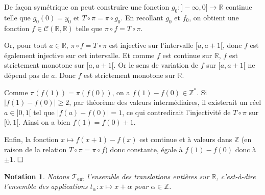 \documentclass[11pt,a4 paper]{article}
\newtheorem{nota}[theoreme]{Notation}
\newcommand{\Rbb}{\mathbb{R}}
\newcommand{\Cc}{\mathcal{C}}
\newcommand{\Tent}{\mathcal{T}_{\mathrm{ent}}}
\begin{document}
	\par De façon symétrique on peut construire une fonction $g_0:]-\infty,0]\to \Rbb$ continue telle que $g_0(0)=y_0$ et $T \circ \pi = \pi \circ g_0$. En recollant $g_0$ et $f_0$, on obtient une fonction $f \in \Cc(\Rbb,\Rbb)$ telle que $\pi \circ f = T \circ \pi$.\\
	
	\par Or, pour tout $a \in \Rbb$, $\pi\circ f=T\circ \pi$ est injective sur l'intervalle $[a,a+1[$, donc $f$ est également injective sur cet intervalle. Et comme $f$ est continue sur $\Rbb$, $f$ est strictement monotone sur $[a,a+1[$. Or le sens de variation de $f$ sur $[a,a+1[$ ne dépend pas de $a$. Donc $f$ est strictement monotone sur $\Rbb$.\\
	
	\par Comme $\pi(f(1))=\pi(f(0))$, on a $f(1)-f(0)\in \mathbb{Z}^*$. Si $|f(1)-f(0)| \geq 2$, par théorème des valeurs intermédiaires, il existerait un réel $a \in ]0,1[$ tel que $|f(a)-f(0)|=1$, ce qui contredirait l'injectivité de $T\circ\pi$ sur $[0,1[$. Ainsi on a bien $f(1)=f(0)\pm 1$. \\
	
	\par Enfin, la fonction $x\mapsto f(x+1)-f(x)$ est continue et à valeurs dans $\mathbb{Z}$ (en raison de la relation $T \circ \pi = \pi \circ f$) donc constante, égale à $f(1)-f(0)$ donc à $\pm 1$. $\hfill \square$\\


\begin{nota}
	Notons $\Tent$ l'ensemble des translations entières sur $\Rbb$, c'est-à-dire l'ensemble des applications $t_\alpha: x \mapsto x + \alpha$ pour $\alpha \in \mathbb{Z}$.
\end{nota}
\vspace{8mm}
\end{document}
